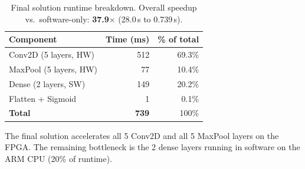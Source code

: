 \documentclass[11pt,a4paper]{article}
\begin{document}
\begin{table}[H]
\centering
\begin{tabular}{lrr}
\toprule
\textbf{Component} & \textbf{Time (ms)} & \textbf{\% of total} \\
\midrule
Conv2D (5 layers, HW)  & 512  & 69.3\% \\
MaxPool (5 layers, HW) & 77   & 10.4\% \\
Dense (2 layers, SW)   & 149  & 20.2\% \\
Flatten + Sigmoid      & 1    & 0.1\%  \\
\midrule
\textbf{Total}         & \textbf{739} & 100\% \\
\bottomrule
\end{tabular}
\caption{Final solution runtime breakdown. Overall speedup vs.\ software-only: \textbf{37.9$\times$} (28.0\,s to 0.739\,s).}
\end{table}

The final solution accelerates all 5 Conv2D and all 5 MaxPool layers on the FPGA.
The remaining bottleneck is the 2 dense layers running in software on the ARM CPU (20\% of runtime).
\end{document}
